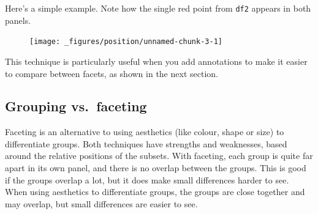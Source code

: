 Here's a simple example. Note how the single red point from \texttt{df2}
appears in both panels.

\begin{Shaded}
\begin{Highlighting}[]
\StringTok{ }\NormalTok{(} \NormalTok{:}\NormalTok{, } \NormalTok{:}\NormalTok{, } \NormalTok{(}\NormalTok{, }\NormalTok{, }\NormalTok{))}
\StringTok{ }\NormalTok{(} \NormalTok{, } \NormalTok{)}

\StringTok{ }
\StringTok{  }\NormalTok{(}  \NormalTok{, } \NormalTok{) +}\StringTok{ }
\StringTok{  }\NormalTok{() +}\StringTok{ }
\StringTok{  }
\end{Highlighting}
\end{Shaded}

\begin{figure}[H]
  \centering
  \texttt{[image: \_figures/position/unnamed-chunk-3-1]}
\end{figure}

This technique is particularly useful when you add annotations to make
it easier to compare between facets, as shown in the next section.

\subsection{Grouping vs.~faceting}\label{sub:group-vs-facet}

Faceting is an alternative to using aesthetics (like colour, shape or
size) to differentiate groups. Both techniques have strengths and
weaknesses, based around the relative positions of the subsets.
  With
faceting, each group is quite far apart in its own panel, and there is
no overlap between the groups. This is good if the groups overlap a lot,
but it does make small differences harder to see. When using aesthetics
to differentiate groups, the groups are close together and may overlap,
but small differences are easier to see.


